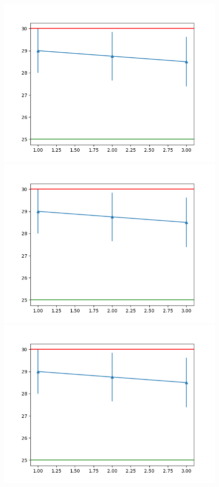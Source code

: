 \documentclass[9pt]{article}
\begin{document}
\begin{figure}
\begin{multicols}{4}[\columnsep=1cm]
    \includegraphics[width=\linewidth]{b}
    \includegraphics[width=\linewidth]{b}
    \includegraphics[width=\linewidth]{b}

\end{multicols}
\end{figure}
\end{document}
